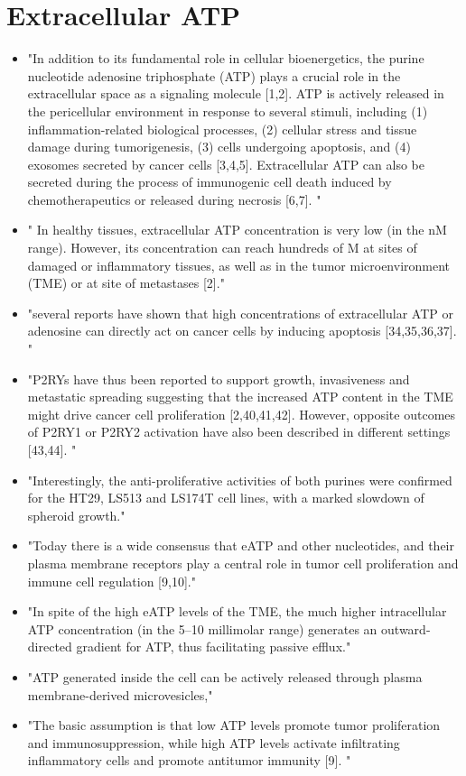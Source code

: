 \documentclass[11pt,a4paper]{article}
\begin{document}
\section{Extracellular ATP}
\begin{itemize}
\item "In addition to its fundamental role in cellular bioenergetics, the purine nucleotide adenosine triphosphate (ATP) plays a crucial role in the extracellular space as a signaling molecule [1,2]. ATP is actively released in the pericellular environment in response to several stimuli, including (1) inflammation-related biological processes, (2) cellular stress and tissue damage during tumorigenesis, (3) cells undergoing apoptosis, and (4) exosomes secreted by cancer cells [3,4,5]. Extracellular ATP can also be secreted during the process of immunogenic cell death induced by chemotherapeutics or released during necrosis [6,7]. "\cite{Dillard2021}
\item " In healthy tissues, extracellular ATP concentration is very low (in the nM range). However, its concentration can reach hundreds of \textmu M at sites of damaged or inflammatory tissues, as well as in the tumor microenvironment (TME) or at site of metastases [2]."\cite{Dillard2021}
\item "several reports have shown that high concentrations of extracellular ATP or adenosine can directly act on cancer cells by inducing apoptosis [34,35,36,37]. "\cite{Dillard2021}
\item "P2RYs have thus been reported to support growth, invasiveness and metastatic spreading suggesting that the increased ATP content in the TME might drive cancer cell proliferation [2,40,41,42]. However, opposite outcomes of P2RY1 or P2RY2 activation have also been described in different settings [43,44]. "\cite{Dillard2021}
\item "Interestingly, the anti-proliferative activities of both purines were confirmed for the HT29, LS513 and LS174T cell lines, with a marked slowdown of spheroid growth."\cite{Dillard2021}
\item "Today there is a wide consensus that eATP and other nucleotides, and their plasma membrane receptors play a central role in tumor cell proliferation and immune cell regulation [9,10]."\cite{Vultaggio2020}
\item "In spite of the high eATP levels of the TME, the much higher intracellular ATP concentration (in the 5–10 millimolar range) generates an outward-directed gradient for ATP, thus facilitating passive efflux."\cite{Vultaggio2020}
\item "ATP generated inside the cell can be actively released through plasma membrane-derived microvesicles,"\cite{Vultaggio2020}
\item "The basic assumption is that low ATP levels promote tumor proliferation and immunosuppression, while high ATP levels activate infiltrating inflammatory cells and promote antitumor immunity [9]. "\cite{Vultaggio2020}
\end{itemize}
\end{document}
